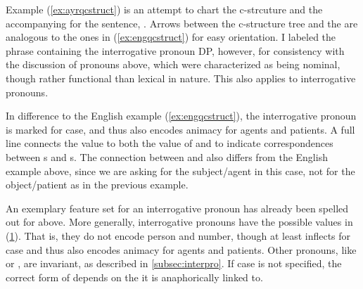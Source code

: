 Example (\ref{ex:ayrqcstruct}) is an attempt to chart the c-strcuture and the
accompanying \Avm{} for the sentence, .
Arrows between the c-structure tree and the \Avm{} are analogous to the ones in
(\ref{ex:engqcstruct}) for easy orientation. I labeled the phrase containing
the interrogative pronoun DP, however, for consistency with the discussion of
pronouns above, which were characterized as being nominal, though rather
functional than lexical in nature. This also applies to interrogative pronouns.

In difference to the English example (\ref{ex:engqcstruct}), the interrogative
pronoun is marked for case, and thus also encodes animacy for agents and
patients. A full line connects the \Foc{} value to both the value of \Q{} and
\Subj{} to indicate correspondences between \DF{}s and \GF{}s. The connection
between \Foc{} and \Subj{} also differs from the English example above, since
we are asking for the subject/agent in this case, not for the object/patient as
in the previous example.

An exemplary feature set for an interrogative pronoun has already been spelled
out for  above. More generally, interrogative pronouns
have the possible values in (\ref{ex:interpromorphlex}). That is, they do not
encode person and number, though at least  inflects for case
and thus also encodes animacy for agents and patients. Other pronouns, like
 or , are invariant, as
described in \autoref{subsec:interpro}. If case is not specified, the correct
form of  depends on the \GF{} it is anaphorically linked to.

\begin{figure}
\begin{morphlex}
\ex\label{ex:interpromorphlex}
\xe
\end{morphlex}
\end{figure}

